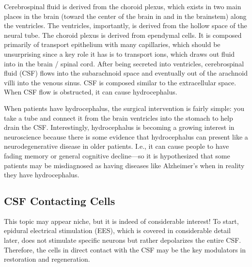 \documentclass[12pt]{report}
\begin{document}
Cerebrospinal fluid is derived from the choroid plexus, which exists in two main places in the brain (toward the center of the brain in and in the brainstem) along the ventricles. The ventricles, importantly, is derived from the hollow space of the neural tube. The choroid plexus is derived from ependymal cells. It is composed primarily of transport epithelium with many capillaries, which should be unsurprising since a key role it has is to transport ions, which draws out fluid into in the brain / spinal cord. After being secreted into ventricles, cerebrospinal fluid (CSF) flows into the subarachnoid space and eventually out of the arachnoid villi into the venous sinus. CSF is composed similar to the extracellular space. When CSF flow is obstructed, it can cause hydrocephalus.\newline

When patients have hydrocephalus, the surgical intervention is fairly simple: you take a tube and connect it from the brain ventricles into the stomach to help drain the CSF. Interestingly, hydrocephalus is becoming a growing interest in neuroscience because there is some evidence that hydrocephalus can present like a neurodegenerative disease in older patients. I.e., it can cause people to have fading memory or general cognitive decline---so it is hypothesized that some patients may be misdiagnosed as having diseases like Alzheimer's when in reality they have hydrocephalus.


\subsection{CSF Contacting Cells}

This topic may appear niche, but it is indeed of considerable interest! To start, epidural electrical stimulation (EES), which is covered in considerable detail later, does not stimulate specific neurons but rather depolarizes the entire CSF. Therefore, the cells in direct contact with the CSF may be the key modulators in restoration and regeneration.\newline
\end{document}
